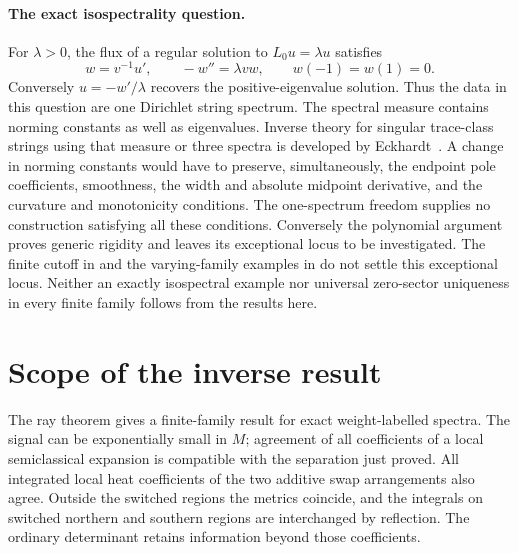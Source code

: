 \documentclass[11pt,letterpaper]{article}
\begin{document}
\paragraph{The exact isospectrality question.}
For \(\lambda>0\), the flux of a regular solution to \(L_0u=\lambda u\)
satisfies
\[
 w=v^{-1}u',\qquad -w''=\lambda v w,\qquad w(-1)=w(1)=0 .
\]
Conversely \(u=-w'/\lambda\) recovers the positive-eigenvalue solution.
Thus the data in this question are one Dirichlet string spectrum.
The spectral measure contains norming constants as well as eigenvalues.
Inverse theory for singular trace-class strings using that measure or
three spectra is developed by Eckhardt~\cite{eck}. A change in norming
constants would have to preserve, simultaneously, the endpoint pole
coefficients, smoothness, the width and absolute midpoint derivative,
and the curvature and monotonicity conditions. The one-spectrum
freedom supplies no construction satisfying all these conditions.
Conversely the polynomial argument proves generic rigidity and leaves
its exceptional locus to be investigated. The finite cutoff in
\cite[Theorem~7.1]{original} and the varying-family examples in
\cite[Theorem~6.2]{original}
do not settle this exceptional locus. Neither an exactly isospectral
example nor universal zero-sector uniqueness in every finite family
follows from the results here.

\section{Scope of the inverse result}

The ray theorem gives a finite-family result for exact weight-labelled
spectra. The signal can be exponentially small in \(M\); agreement of
all coefficients of a local semiclassical expansion is compatible with
the separation just proved. All integrated local heat coefficients of
the two additive swap arrangements also agree. Outside the switched
regions the metrics coincide, and the integrals on switched northern
and southern regions are interchanged by reflection. The ordinary
determinant retains information beyond those coefficients.
\end{document}
